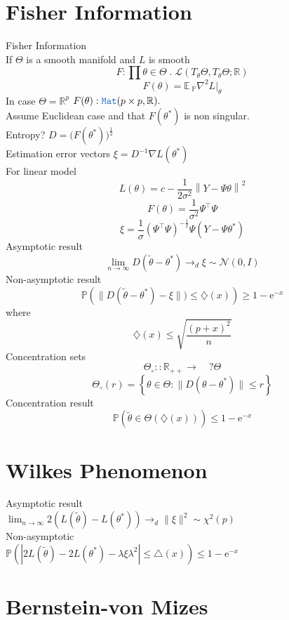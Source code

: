 \documentclass[12pt]{article}
\newcommand{\TYPE}[1]{\textcolor{NavyBlue}{\mathtt{#1}}}
\newcommand{\LOGIC}[1]{\textcolor{Blue}{\mathtt{#1}}}
\renewcommand{\.}{\; . \;}
\newcommand{\Reals}{\mathbb{R} }
\newcommand{\E}{ \; \LOGIC{Extract} }
\renewcommand{\l}{\lambda}
\renewcommand{\P}{\mathbb{P}}
\renewcommand*{\E}{\mathbb{E} \,}
\begin{document}
 \section{Fisher Information}
 Fisher Information \\ 
 If $\Theta$ is a smooth manifold and $L$ is smooth
 $$  
 F : \prod \theta \in \Theta \. \mathcal{L}(T_\theta \Theta, T_\theta \Theta; \Reals)  
 $$
 $$
 F(\theta) = \E_\P \nabla^2 L |_{\theta}
 $$
 In case $\Theta = \Reals^p$ $F(\theta) : \TYPE{Mat}(p\times p, \Reals ).$ \\
 Assume Euclidean case and  that $F(\theta^*)$ is non singular. \\
 Entropy? $D = \big(F(\theta^*)\big)^{\frac{1}{2}}$ \\
 Estimation error vectors $\xi = D^{-1}\nabla L(\theta^*)$ \\
 For linear model \\
 $$ L(\theta) = c - \frac{1}{2\sigma^2}\left\| Y - \Psi \theta  \right\|^2 $$
 $$ F(\theta) = \frac{1}{\sigma^2}\Psi^\top \Psi $$
 $$ \xi = \frac{1}{\sigma}\left (  \Psi^\top \Psi \right )^{-\frac{1}{2}}\Psi (Y - \Psi \theta^*)  $$
  Asymptotic result 
  $$ \lim_{n \to \infty} D(\tilde \theta - \theta^*) \to_d \xi \sim \mathcal{N}(0,I) $$
  Non-asymptotic result
  $$ 
   \P\left (\| D(\tilde \theta - \theta^*) - \xi \|) \le \diamondsuit(x) \right )    \ge 1 - \mathrm{e}^{-x}
  $$  
  where
  $$
  \diamondsuit(x) \le \sqrt{ \frac{(p + x)^2}{n} }
  $$
  Concentration sets 
  $$ \Theta_\circ :: \Reals_{++} \to \quad  ?\Theta $$
  $$ \Theta_\circ(r) =  \left\{ \theta \in \Theta : \| D(\theta - \theta^*) \| \le r \right\}  $$
  Concentration result
  $$
     \P( \tilde \theta \in \Theta(\diamondsuit(x))) \le 1 - \mathrm{e}^{-x} 
  $$
  \newpage
\section{Wilkes Phenomenon}
Asymptotic result  \\
$\lim_{n \to \infty} 2(L(\tilde \theta) - L(\theta^*)) \to_d \| \xi \|^2 \sim \chi^2(p)$ \\
Non-asymptotic \\
$ \P( |2L(\tilde \theta) - 2L(\theta^*)  - \l \xi \l^2| \le \triangle(x) ) \le 1 - \mathrm{e}^{-x} $ 
 \\
\newpage
\section{Bernstein-von Mizes}
\end{document}
